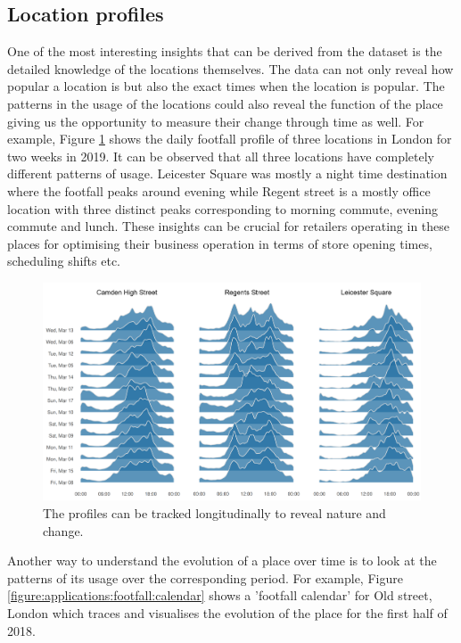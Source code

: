 \subsection{Location profiles}
One of the most interesting insights that can be derived from the dataset is the detailed knowledge of the locations themselves.
The data can not only reveal how popular a location is but also the exact times when the location is popular.
The patterns in the usage of the locations could also reveal the function of the place giving us the opportunity to measure their change through time as well.
For example, Figure \ref{figure:applications:location:profiles} shows the daily footfall profile of three locations in London for two weeks in 2019.
It can be observed that all three locations have completely different patterns of usage.
Leicester Square was mostly a night time destination where the footfall peaks around evening while Regent street is a mostly office location with three distinct peaks corresponding to morning commute, evening commute and lunch.
These insights can be crucial for retailers operating in these places for optimising their business operation in terms of store opening times, scheduling shifts etc.

\begin{figure}
  \includegraphics[trim={0 10 0 0},clip]{images/applications-location-profiles.png}
  \caption{The profiles can be tracked longitudinally to reveal nature and change.}
  \label{figure:applications:location:profiles}
\end{figure}

Another way to understand the evolution of a place over time is to look at the patterns of its usage over the corresponding period.
For example, Figure \ref{figure:applications:footfall:calendar} shows a 'footfall calendar' for Old street, London which traces and visualises the evolution of the place for the first half of 2018.

